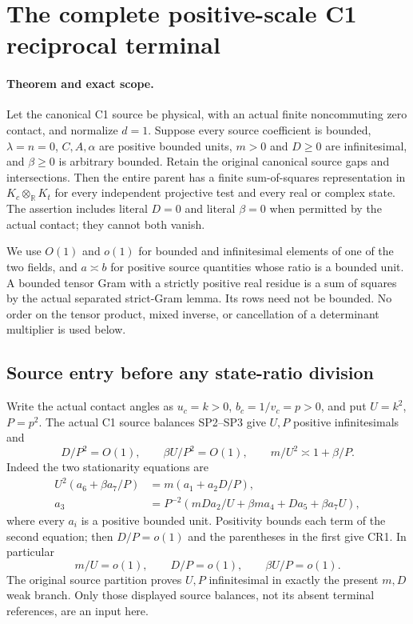 \section{The complete positive-scale C1 reciprocal terminal}
\label{sec:c1-reciprocal-rederived}

\paragraph{Theorem and exact scope.}
Let the canonical C1 source be physical, with an actual finite
noncommuting zero contact, and normalize $d=1$. Suppose every source
coefficient is bounded, $\lambda=n=0$, $C,A,\alpha$ are positive
bounded units, $m>0$ and $D\geq0$ are infinitesimal, and
$\beta\geq0$ is arbitrary bounded. Retain the original canonical
source gaps and intersections. Then the entire parent has a finite
sum-of-squares representation in $K_c\otimes_{\mathbb R}K_t$ for
every independent projective test and every real or complex state.
The assertion includes literal $D=0$ and literal $\beta=0$ when
permitted by the actual contact; they cannot both vanish.

We use $O(1)$ and $o(1)$ for bounded and infinitesimal elements of
one of the two fields, and $a\asymp b$ for positive source quantities
whose ratio is a bounded unit. A bounded tensor Gram with a strictly
positive real residue is a sum of squares by the actual separated
strict-Gram lemma. Its rows need not be bounded. No order on the tensor
product, mixed inverse, or cancellation of a determinant multiplier is
used below.

\subsection{Source entry before any state-ratio division}

Write the actual contact angles as $u_c=k>0$, $b_c=1/v_c=p>0$,
and put $U=k^2$, $P=p^2$. The actual C1 source balances SP2--SP3
give $U,P$ positive infinitesimals and
\[
 D/P^2=O(1),\qquad \beta U/P^2=O(1),\qquad
 m/U^2\asymp1+\beta/P.
 \tag{CR1}
\]
Indeed the two stationarity equations are
\[
\begin{aligned}
 U^2(a_6+\beta a_7/P)&=m(a_1+a_2D/P),\\
 a_3&=P^{-2}(mDa_2/U+\beta ma_4+Da_5+\beta a_7U),
\end{aligned}
\]
where every $a_i$ is a positive bounded unit. Positivity bounds
each term of the second equation; then $D/P=o(1)$ and the
parentheses in the first give CR1. In particular
\[
 m/U=o(1),\qquad D/P=o(1),\qquad \beta U/P=o(1).
 \tag{CR2}
\]
The original source partition proves $U,P$ infinitesimal in exactly
the present $m,D$ weak branch. Only those displayed source balances,
not its absent terminal references, are an input here.

